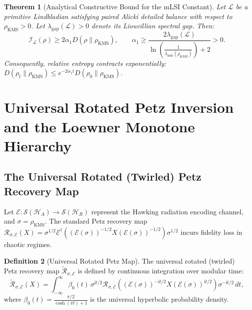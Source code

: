 \documentclass[11pt,a4paper]{article}
\theoremstyle{plain}
\newtheorem{theorem}{Theorem}[section]
\theoremstyle{definition}
\newtheorem{definition}[theorem]{Definition}
\newcommand{\KMS}{\mathrm{KMS}}
\begin{document}
\begin{theorem}[Analytical Constructive Bound for the mLSI Constant]
Let $\mathcal{L}$ be a primitive Lindbladian satisfying paired Alicki detailed balance with respect to $\rho_{\KMS} > 0$. Let $\lambda_{\mathrm{gap}}(\mathcal{L}) > 0$ denote its Liouvillian spectral gap. Then:
\begin{equation}
\mathcal{I}_{\mathcal{L}}(\rho) \ge 2 \alpha_1 D(\rho \parallel \rho_{\KMS}), \qquad \alpha_1 \ge \frac{2 \lambda_{\mathrm{gap}}(\mathcal{L})}{\ln\left( \frac{1}{\lambda_{\min}(\rho_{\KMS})} \right) + 2} > 0.
\end{equation}
Consequently, relative entropy contracts exponentially: $D(\rho_t \parallel \rho_{\KMS}) \le e^{-2\alpha_1 t} D(\rho_0 \parallel \rho_{\KMS})$.
\end{theorem}

\section{Universal Rotated Petz Inversion and the Loewner Monotone Hierarchy}

\subsection{The Universal Rotated (Twirled) Petz Recovery Map}
Let $\mathcal{E}: \mathcal{S}(\mathcal{H}_A) \to \mathcal{S}(\mathcal{H}_R)$ represent the Hawking radiation encoding channel, and $\sigma = \rho_{\KMS}$. The standard Petz recovery map $\mathcal{R}_{\sigma, \mathcal{E}}(X) = \sigma^{1/2} \mathcal{E}^\dagger((\mathcal{E}(\sigma))^{-1/2} X (\mathcal{E}(\sigma))^{-1/2}) \sigma^{1/2}$ incurs fidelity loss in chaotic regimes. 

\begin{definition}[Universal Rotated Petz Map]
The universal rotated (twirled) Petz recovery map $\widetilde{\mathcal{R}}_{\sigma, \mathcal{E}}$ is defined by continuous integration over modular time:
\begin{equation}
\widetilde{\mathcal{R}}_{\sigma, \mathcal{E}}(X) = \int_{-\infty}^\infty \beta_0(t) \, \sigma^{\mathrm{i}t/2} \mathcal{R}_{\sigma, \mathcal{E}}\left( (\mathcal{E}(\sigma))^{-\mathrm{i}t/2} X (\mathcal{E}(\sigma))^{\mathrm{i}t/2} \right) \sigma^{-\mathrm{i}t/2} \, dt,
\label{eq:v5_twirled_petz}
\end{equation}
where $\beta_0(t) = \frac{\pi/2}{\cosh(\pi t) + 1}$ is the universal hyperbolic probability density.
\end{definition}
\end{document}
